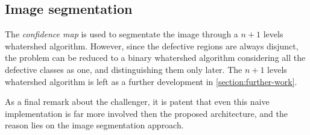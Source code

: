     \subsection{Image segmentation}\label{section:challenger:image-segmentation}
        \par{
            The \emph{confidence map} is used to segmentate the image through a $n+1$ levels whatershed algorithm. However, since the defective regions are always disjunct, the problem can be reduced to a binary whatershed algorithm \cite{ieee:87344} considering all the defective classes as one, and distinguishing them only later. The $n+1$ levels whatershed algorithm is left as a further development in \ref{section:further-work}.
        }
        \par{
            As a final remark about the challenger, it is patent that even this naive implementation is far more involved then the proposed architecture, and the reason lies on the image segmentation approach.
        }